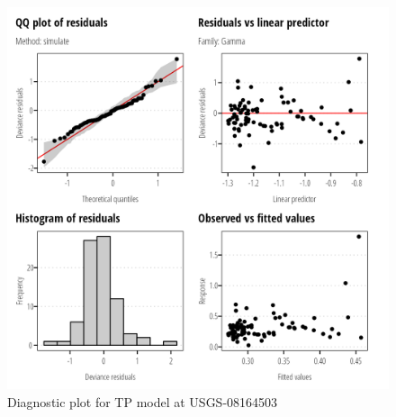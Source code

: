 \documentclass[
]{article}
\begin{document}
\clearpage

\begin{figure}[h]

{\centering \includegraphics{model_assessment_files/figure-pdf/unnamed-chunk-58-1.png}

}

\caption{Diagnostic plot for TP model at USGS-08164503}

\end{figure}
\end{document}
